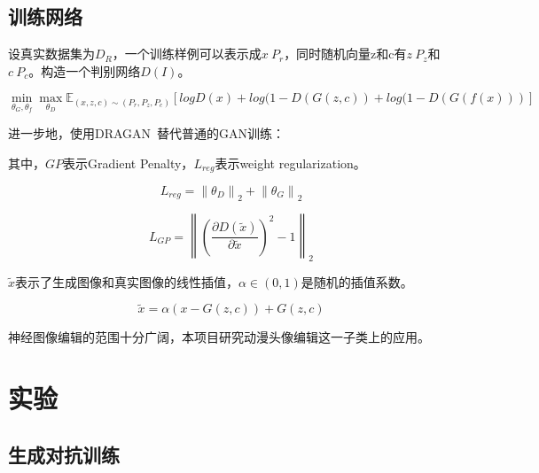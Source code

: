 \documentclass{article}
\newcommand{\norm}[1]{\left\lVert#1\right\rVert}
\begin{document}
\subsection{训练网络}


设真实数据集为$D_R$，一个训练样例可以表示成$x ~ P_r$，同时随机向量z和c有$z ~ P_z$和$c ~ P_c$。构造一个判别网络$D(I)$。

\begin{equation}
  \min_{\theta_G,\theta_f} \max_{\theta_D} \mathbb{E}_{(x, z, c) \sim (P_r, P_z, P_c)} [ log D(x) + log (1 - D(G(z, c)) + log ( 1 - D(G(f(x)))]
\end{equation}

进一步地，使用DRAGAN~\cite{kodali2017convergence}替代普通的GAN训练：



其中，$GP$表示Gradient Penalty，$L_{reg}$表示weight regularization。

\begin{equation}
  L_{reg} = \norm{\theta_D}_2 + \norm{\theta_G}_2
\end{equation}

\begin{equation}
  L_{GP} = \norm{ (\frac{\partial D(\tilde x)}{\partial \tilde x})^2 - 1 }_2
\end{equation}

$\tilde x$表示了生成图像和真实图像的线性插值，$\alpha \in (0, 1)$是随机的插值系数。

\begin{equation}
  \tilde x = \alpha (x - G(z, c)) + G(z, c)
\end{equation}


神经图像编辑的范围十分广阔，本项目研究动漫头像编辑这一子类上的应用。

\section{实验}

\subsection{生成对抗训练}


\end{document}
